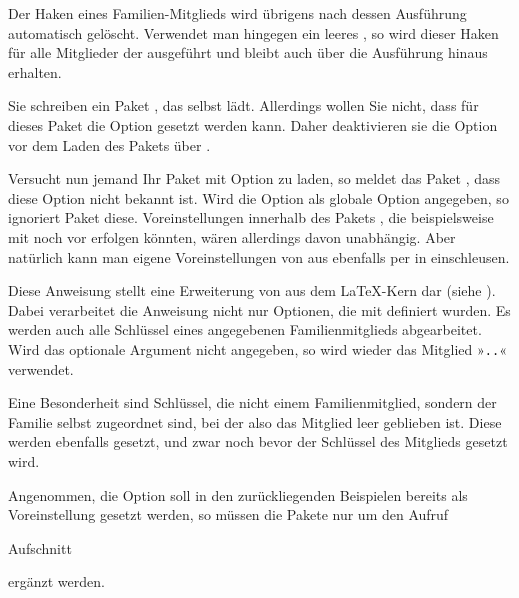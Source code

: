 Der Haken eines Familien-Mitglieds wird übrigens nach dessen Ausführung
automatisch gelöscht. Verwendet man hingegen ein leeres , so
wird dieser Haken für alle Mitglieder der 
ausgeführt und bleibt auch über die Ausführung hinaus erhalten.

\begin{Example}
  Sie schreiben ein Paket , das selbst 
  lädt. Allerdings wollen Sie nicht, dass für dieses Paket die Option
   gesetzt werden kann. Daher deaktivieren sie die Option
  vor dem Laden des Pakets über .
\begin{lstcode}
  \RequirePackage{scrbase}
\end{lstcode}
  Versucht nun jemand Ihr Paket mit Option
   zu laden, so meldet das Paket , dass
  diese Option nicht bekannt ist. Wird die Option  als
  globale Option angegeben, so ignoriert Paket 
  diese. Voreinstellungen innerhalb des Pakets , die
  beispielsweise mit  noch vor
   erfolgen könnten, wären
  allerdings davon unabhängig. Aber natürlich kann man eigene
  Voreinstellungen von  aus ebenfalls per
   in  einschleusen.%
\end{Example}
\EndIndexGroup
\ExampleEndFix


\begin{Declaration}
\end{Declaration}
Diese Anweisung stellt eine Erweiterung von
 aus dem \LaTeX-Kern dar (siehe
\cite{latex:clsguide}). Dabei verarbeitet die Anweisung nicht nur Optionen,
die mit  definiert wurden. Es werden auch alle Schlüssel
eines angegebenen Familienmitglieds abgearbeitet. Wird das optionale Argument
 nicht angegeben, so wird wieder das Mitglied
»\texttt{.}\texttt{.}« verwendet.

Eine Besonderheit sind Schlüssel, die nicht einem Familienmitglied, sondern
der Familie selbst zugeordnet sind, bei der also das Mitglied leer geblieben
ist. Diese werden ebenfalls gesetzt, und zwar noch bevor der Schlüssel des
Mitglieds gesetzt wird.
\begin{Example}
  Angenommen, die Option  soll in den zurückliegenden
  Beispielen bereits als Voreinstellung gesetzt werden, so müssen die Pakete
  nur um den Aufruf
\begin{lstcode}
                       {Aufschnitt}
\end{lstcode}
  ergänzt werden.
\end{Example}


